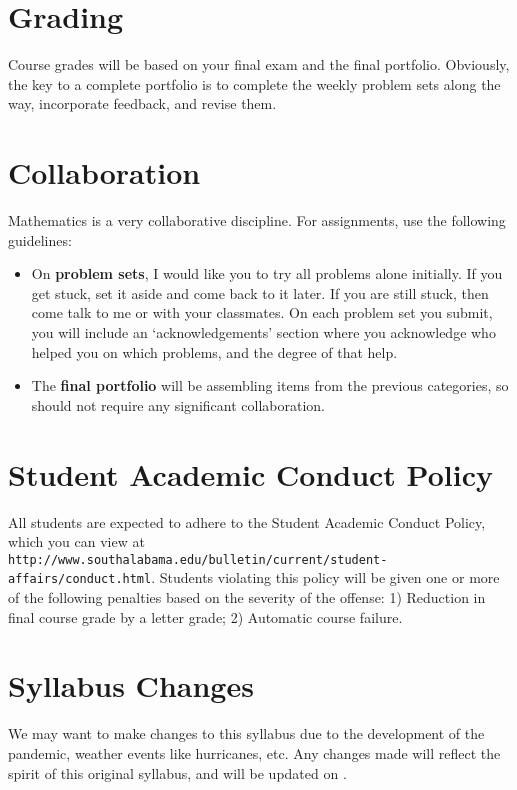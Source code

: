 \documentclass{article}
\begin{document}
\section*{\fontsize{12}{15}\selectfont Grading}
Course grades will be based on your final exam and the final portfolio. Obviously, the key to a complete portfolio is to complete the weekly problem sets along the way, incorporate feedback, and revise them.

\section*{\fontsize{12}{15}\selectfont Collaboration}
Mathematics is a very collaborative discipline.   For assignments, use the following guidelines:
\begin{itemize}
\item On \textbf{problem sets}, I would like you to try all problems alone initially. If you get stuck, set it aside and come back to it later.  If you are still stuck, then come talk to me or with your classmates.  On each problem set you submit, you will include an `acknowledgements' section where you acknowledge who helped you on which problems, and the degree of that help.
\item The \textbf{final portfolio} will be assembling items from the previous categories, so should not require any significant collaboration.
\end{itemize}



\section*{\fontsize{12}{15}\selectfont Student Academic Conduct Policy}
All students are expected to adhere to the Student Academic Conduct Policy, which you can view at
{\tt http://www.southalabama.edu/bulletin/current/student-affairs/conduct.html}.  Students violating this policy will be given one or more of the following penalties based on the severity of the offense:  1) Reduction in final course grade by a letter grade; 2) Automatic course failure.


\section*{\fontsize{12}{15}\selectfont Syllabus Changes}
We may want to make changes to this syllabus due to the development of the pandemic, weather events like hurricanes, etc. Any changes made will reflect the spirit of this original syllabus, and will be updated on \LMS.
\end{document}
